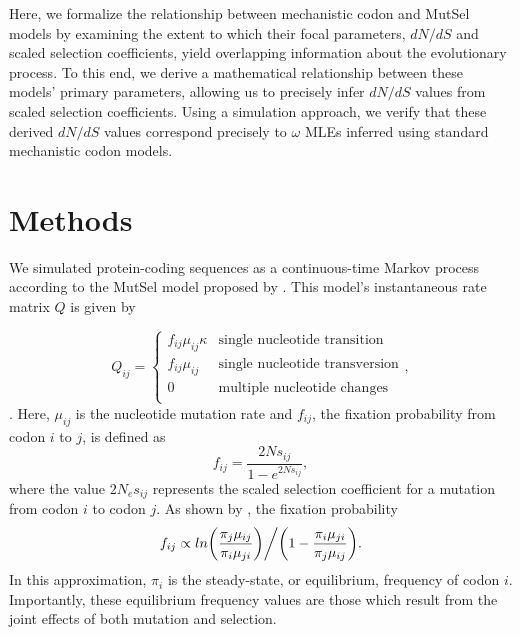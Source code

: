 \documentclass[11pt]{article}
\begin{document}
Here, we formalize the relationship between mechanistic codon and MutSel models by examining the extent to which their focal parameters, $dN/dS$ and scaled selection coefficients, yield overlapping information about the evolutionary process. To this end, we derive a mathematical relationship between these models' primary parameters, allowing us to precisely infer $dN/dS$ values from scaled selection coefficients. Using a simulation approach, we verify that these derived $dN/dS$ values correspond precisely to $\omega$ MLEs inferred using standard mechanistic codon models. 


\section*{Methods}

We simulated protein-coding sequences as a continuous-time Markov process \cite{Yang2006} according to the MutSel model proposed by \cite{HalpernBruno1998}. This model's instantaneous rate matrix $Q$ is given by 

\begin{equation}\label{eq:BHmatrix}
Q_{ij} = \left\{ \begin{array}{rl}
              f_{ij}\mu_{ij}\kappa               &\mbox{single nucleotide transition} \\
              f_{ij}\mu_{ij}                          &\mbox{single nucleotide transversion} \\
              0                                           &\mbox{multiple nucleotide changes} \\             
         \end{array} \right.,
\end{equation}. Here, $\mu_{ij}$ is the nucleotide mutation rate and $f_{ij}$, the fixation probability from codon $i$ to $j$, is defined as 
\begin{equation} f_{ij}  = \frac{2Ns_{ij}}{1 - e^{2Ns_{ij}}}, \end{equation} where the value $2N_es_{ij}$ represents the scaled selection coefficient for a mutation from codon $i$ to codon $j$\cite{HalpernBruno1998, YangNielsen2008}. As shown by \cite{HalpernBruno1998}, the fixation probability \begin{equation}f_{ij} \propto ln\bigg{(}\frac{\pi_j\mu_{ij}}{\pi_i\mu_{ji}}\bigg{)}\bigg{/}\bigg{(}1 - \frac{\pi_i\mu_{ji}}{\pi_j\mu_{ij}}\bigg{)}.\end{equation} In this approximation, $\pi_i$ is the steady-state, or equilibrium, frequency of codon $i$. Importantly, these equilibrium frequency values are those which result from the joint effects of both mutation and selection. 
\end{document}
